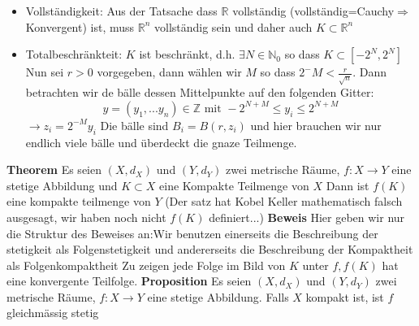 \documentclass{article}
\begin{document}
\begin{itemize}
  \item[]{Vollständigkeit:  Aus der Tatsache dass $\mathbb{R}$ vollständig (vollständig=Cauchy$\Rightarrow$Konvergent) ist, muss $\mathbb{R}^n$ vollständig sein und daher auch $K\subset \mathbb{R}^n$}
  \item[]{Totalbeschränkteit:   $K$ ist beschränkt, d.h. $\exists N\in\mathbb{N}_0$ so dass $K\subset[-2^N,2^N]$ Nun sei $r>0$ vorgegeben, dann wählen wir $M$ so dass $2^-M<\frac{r}{\sqrt{n}}$. Dann betrachten wir de bälle dessen Mittelpunkte auf den folgenden Gitter:\[y=(y_1,...y_n)\in\mathbb{Z}\text{ mit } -2^{N+M}\le y_i\le2^{N+M}\]$\rightarrow z_i=2^{-M}y_i$ Die bälle sind $B_i=B(r,z_i)$ und hier brauchen wir nur endlich viele bälle und überdeckt die gnaze Teilmenge. }\end{itemize}
\noindent
\textbf{Theorem} Es seien $(X,d_X)$ und $(Y,d_Y)$ zwei metrische Räume, $f:X\rightarrow Y$ eine stetige Abbildung und $K\subset X$ eine Kompakte Teilmenge von $X$ Dann ist $f(K)$ eine kompakte teilmenge von $Y$ (Der satz hat Kobel Keller mathematisch falsch ausgesagt, wir haben noch nicht $f(K)$ definiert...)\newline
\textbf{Beweis} Hier geben wir nur die Struktur des Beweises an:\newline Wir benutzen einerseits die Beschreibung der stetigkeit als Folgenstetigkeit und andererseits die Beschreibung der Kompaktheit als Folgenkompaktheit\newline 
Zu zeigen jede Folge im Bild von $K$ unter $f,f(K)$ hat eine konvergente Teilfolge.
\textbf{Proposition} Es seien $(X,d_X)$ und $(Y,d_Y)$ zwei metrische Räume, $f:X\rightarrow Y$ eine stetige Abbildung. Falls $X$ kompakt ist, ist $f$ gleichmässig stetig\newline
\end{document}
